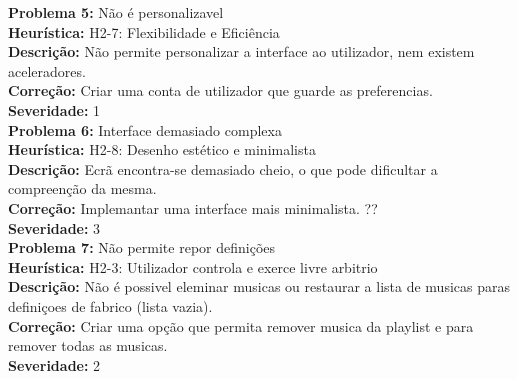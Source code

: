 \documentclass{article}
\begin{document}
\textbf{Problema 5:} Não é personalizavel \\
\textbf{Heurística:} H2-7: Flexibilidade e Eficiência\\
\textbf{Descrição:} Não permite personalizar a interface ao utilizador, nem existem aceleradores.\\
\textbf{Correção:} Criar uma conta de utilizador que guarde as preferencias.\\
\textbf{Severidade:} 1\\

\textbf{Problema 6:} Interface demasiado complexa\\
\textbf{Heurística:} H2-8: Desenho estético e minimalista\\
\textbf{Descrição:} Ecrã encontra-se demasiado cheio, o que pode dificultar a compreenção da mesma.\\
\textbf{Correção:} Implemantar uma interface mais minimalista. ??\\
\textbf{Severidade:} 3\\


\textbf{Problema 7:} Não permite repor definições \\
\textbf{Heurística:} H2-3: Utilizador controla e exerce livre arbitrio\\
\textbf{Descrição:} Não é possivel eleminar musicas ou restaurar a lista de musicas paras definiçoes de fabrico (lista vazia).\\
\textbf{Correção:} Criar uma opção que permita remover musica da playlist e para remover todas as musicas.\\
\textbf{Severidade:} 2\\
\end{document}

